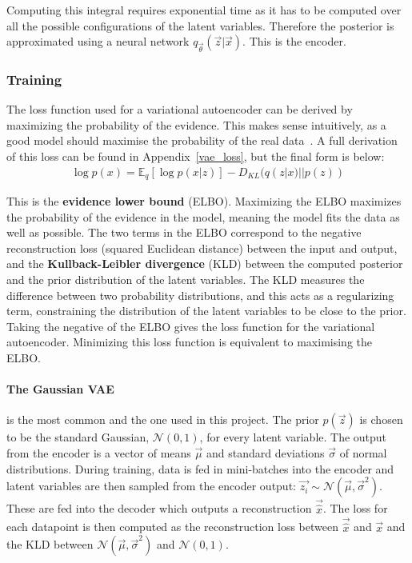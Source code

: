 Computing this integral requires exponential time as it has to be computed over all the possible configurations of
the latent variables. Therefore the posterior is approximated using a neural network $q_{\vec{\theta}}(\vec{z}|\vec{x})$. 
This is the encoder.

\subsubsection{Training}

The loss function used for a variational autoencoder can be derived by maximizing the probability of the evidence.
This makes sense intuitively, as a good model should maximise the probability of the real data~\cite{SVIPartI90:online}. A full derivation
of this loss can be found in Appendix~\ref{vae_loss}, but the final form is below:
\begingroup
\allowdisplaybreaks
\begin{align}
  \log p(x) = \mathbb{E}_q [\log p(x|z)] - D_{KL}(q(z|x)||p(z))
\end{align}
\endgroup

This is the \textbf{evidence lower bound} (ELBO). Maximizing the ELBO maximizes the probability of the 
evidence in the model, meaning the model fits the data as well as possible. The two terms in the ELBO correspond to the negative 
reconstruction loss (squared Euclidean distance) between the input and output, and the \textbf{Kullback-Leibler divergence} (KLD) between 
the computed posterior and the prior distribution of the latent variables. 
The KLD measures the difference between two probability distributions, and this acts as a regularizing term, constraining the distribution 
of the latent variables to be close to the prior. Taking the 
negative of the ELBO gives the loss function for the variational autoencoder. Minimizing this loss function is equivalent to maximising the ELBO.

\paragraph{The Gaussian VAE}is the most common and the one used in this project. The prior $p(\vec{z})$ is chosen to be the standard Gaussian, 
$\mathcal{N}(0, 1)$,
for every latent variable. The output from the encoder is a vector of means $\vec{\mu}$ and standard deviations $\vec{\sigma}$ of normal distributions. 
During training, data is fed in mini-batches into the encoder and latent variables are then sampled from the encoder output: 
$\vec{z_{i}} \sim \mathcal{N}(\vec{\mu}, \vec{\sigma}^{2})$. These are fed into the decoder which outputs a reconstruction $\vec{\hat{x}}$. 
The loss for each datapoint is then computed as the reconstruction loss between $\vec{\hat{x}}$ and $\vec{x}$ and the KLD between
$\mathcal{N}(\vec{\mu}, \vec{\sigma}^{2})$ and $\mathcal{N}(0, 1)$.


